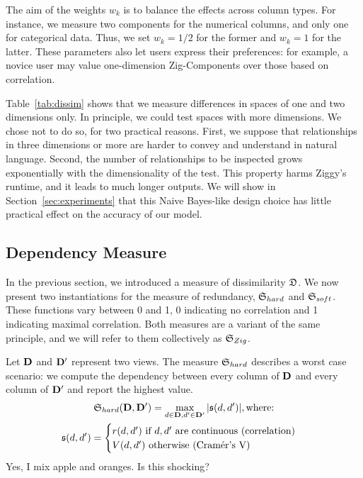 The aim of the weights $w_k$ is to balance the effects across column types. For
instance, we measure two components for the numerical columns, and only one for
categorical data.  Thus, we set $w_k = 1/2$ for the former and $w_k = 1$
for the latter.  These parameters also let users express their preferences: for
example, a novice user may value one-dimension Zig-Components over those based
on correlation.

Table~\ref{tab:dissim} shows that we measure differences in spaces of one and
two dimensions only.  In principle, we could test spaces with more dimensions.
We chose not to do so, for two practical reasons. First, we suppose that
relationships in three dimensions or more are harder to convey and understand
in natural language.  Second, the number of relationships to be inspected grows
exponentially with the dimensionality of the test. This property harms Ziggy's
runtime, and it leads to much longer outputs. We will show in
Section~\ref{sec:experiments} that this Naive Bayes-like design choice has little
practical effect on the accuracy of our model.


\subsection{Dependency Measure}
\label{sec:dependency}

In the previous section, we introduced a measure of dissimilarity $\mathfrak{D}$. We
now present two instantiations for the measure of redundancy, $\mathfrak{S}_{hard}$
and $\mathfrak{S}_{soft}$.  These functions vary between 0 and 1, 0 indicating no
correlation and 1 indicating maximal correlation. Both measures are a variant
of the same principle, and we will refer to them collectively as
$\mathfrak{S}_{Zig}$.

Let $\mathbf{D}$ and $\mathbf{D}'$ represent two views. The measure $\mathfrak{S}_{hard}$
describes a worst case scenario: we compute the dependency between every
column of $\mathbf{D}$ and every column of  $\mathbf{D}'$ and report the highest value.
\begin{gather}
    \mathfrak{S}_{hard}(\mathbf{D}, \mathbf{D'}) = \max_{d \in \mathbf{D}, d' \in \mathbf{D'}}
    |\mathfrak{s}(d, d')|, \text{where:}\\
         \mathfrak{s}(d, d')= \begin{cases}
             r(d, d')\ \text{if $d, d'$ are continuous (correlation)}\\
             V(d, d')\ \text{otherwise (Cram\'er's V)}
         \end{cases}
\end{gather}
{\color{red} Yes, I mix apple and oranges. Is this shocking?}


